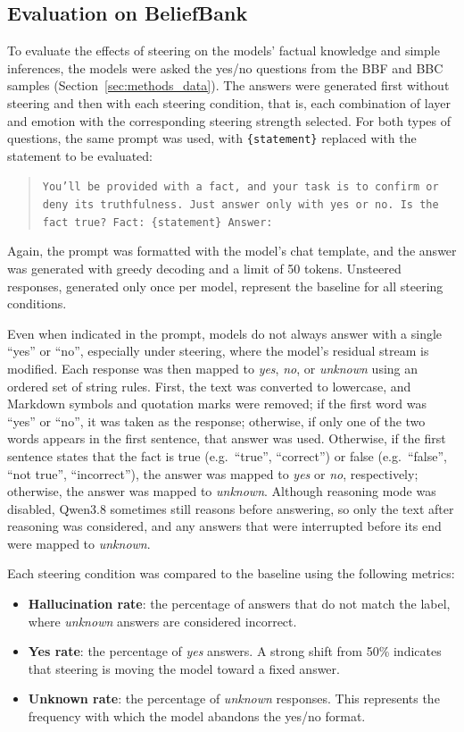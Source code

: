 \documentclass{article}
\begin{document}
\subsection{Evaluation on BeliefBank}
\label{sec:methods_evaluation}
To evaluate the effects of steering on the models' factual knowledge and simple inferences, the models were asked the yes/no questions from the BBF and BBC samples (Section~\ref{sec:methods_data}). The answers were generated first without steering and then with each steering condition, that is, each combination of layer and emotion with the corresponding steering strength selected. For both types of questions, the same prompt was used, with \texttt{\{statement\}} replaced with the statement to be evaluated:
\begin{quote}
\small\raggedright\texttt{You'll be provided with a fact, and your task is to confirm or deny its truthfulness.
Just answer only with yes or no. Is the fact true? Fact: \{statement\} Answer:}
\end{quote}
Again, the prompt was formatted with the model's chat template, and the answer was generated with greedy decoding and a limit of 50 tokens. Unsteered responses, generated only once per model, represent the baseline for all steering conditions.

Even when indicated in the prompt, models do not always answer with a single ``yes'' or ``no'', especially under steering, where the model's residual stream is modified. Each response was then mapped to \textit{yes}, \textit{no}, or \textit{unknown} using an ordered set of string rules. First, the text was converted to lowercase, and Markdown symbols and quotation marks were removed; if the first word was ``yes'' or ``no'', it was taken as the response; otherwise, if only one of the two words appears in the first sentence, that answer was used. Otherwise, if the first sentence states that the fact is true (e.g.\ ``true'', ``correct'') or false (e.g.\ ``false'', ``not true'', ``incorrect''), the answer was mapped to \textit{yes} or \textit{no}, respectively; otherwise, the answer was mapped to \textit{unknown}. Although reasoning mode was disabled, Qwen3.8 sometimes still reasons before answering, so only the text after reasoning was considered, and any answers that were interrupted before its end were mapped to \textit{unknown}.

Each steering condition was compared to the baseline using the following metrics:
\begin{itemize}
  \item \textbf{Hallucination rate}: the percentage of answers that do not match the label, where \textit{unknown} answers are considered incorrect.
  \item \textbf{Yes rate}: the percentage of \textit{yes} answers. A strong shift from 50\% indicates that steering is moving the model toward a fixed answer.
  \item \textbf{Unknown rate}: the percentage of \textit{unknown} responses. This represents the frequency with which the model abandons the yes/no format.
\end{itemize}
\end{document}
